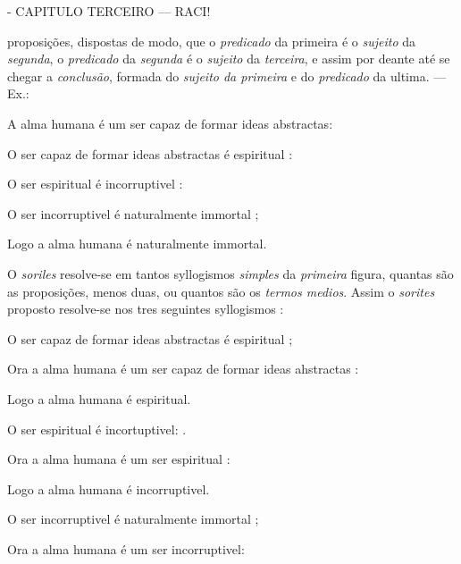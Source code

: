 - CAPITULO TERCEIRO --- RACI!

proposições, dispostas de modo, que o \emph{predicado} da primeira é o \emph{sujeito} da \emph{segunda}, o \emph{predicado} da \emph{segunda} é o \emph{sujeito} da \emph{terceira}, e assim por deante até se chegar a \emph{conclusão}, formada do \emph{sujeito da primeira} e do \emph{predicado} da ultima. --- Ex.:

A alma humana é um ser capaz de formar ideas abstractas:

O ser capaz de formar ideas abstractas é espiritual :

O ser espiritual é incorruptivel :

O ser incorruptivel é naturalmente immortal ;

Logo a alma humana é naturalmente immortal.

O \emph{soriles} resolve-se em tantos syllogismos \emph{simples} da \emph{primeira} figura, quantas são as proposições, menos duas, ou quantos são os \emph{termos medios}. Assim o \emph{sorites} proposto resolve-se nos tres seguintes syllogismos :

O ser capaz de formar ideas abstractas é espiritual ;

Ora a alma humana é um ser capaz de formar ideas ahstractas :

Logo a alma humana é espiritual.

O ser espiritual é incortuptivel: .

Ora a alma humana é um ser espiritual :

Logo a alma humana é incorruptivel.

O ser incorruptivel é naturalmente immortal ;

Ora a alma humana é um ser incorruptivel:

